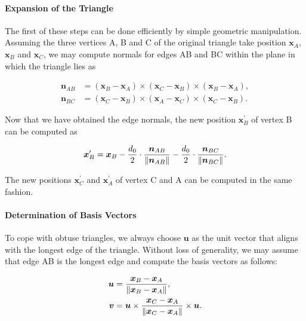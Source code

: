 \documentclass[
	11pt, 
	DIV10,
	ngerman,
	a4paper, 
	oneside, 
	headings=normal, 
	captions=tableheading,
	final, 
	numbers=noenddot
]{scrartcl}
\DeclarePairedDelimiter{\norm}{\lVert}{\rVert}
\begin{document}
\paragraph{Expansion of the Triangle} The first of these steps can be done efficiently by simple geometric manipulation. Assuming the three vertices A, B and C of the original triangle take position $ \boldsymbol{x}_{A} $, $ \boldsymbol{x}_{B} $ and $ \boldsymbol{x}_{C} $, we may compute normals for edges AB and BC within the plane in which the triangle lies as

\begin{equation}
\begin{split}
	\label{eq5}
	\boldsymbol{n}_{AB} &= \left(\boldsymbol{x}_{B} - \boldsymbol{x}_{A}\right) \times \left(\boldsymbol{x}_{C} - \boldsymbol{x}_{B}\right) \times \left(\boldsymbol{x}_{B} - \boldsymbol{x}_{A}\right), \\
	\boldsymbol{n}_{BC} &= \left(\boldsymbol{x}_{C} - \boldsymbol{x}_{B}\right) \times \left(\boldsymbol{x}_{A} - \boldsymbol{x}_{C}\right) \times \left(\boldsymbol{x}_{C} - \boldsymbol{x}_{B}\right).
\end{split}
\end{equation}

Now that we have obtained the edge normals, the new position $ \boldsymbol{x}_{B}^{\prime} $ of vertex B can be computed as

\begin{equation}
	\label{eq6}
	\boldsymbol{x}_{B}^{\prime} = \boldsymbol{x}_{B} - \frac{d_{0}}{2} \cdot \frac{\boldsymbol{n}_{AB}}{\norm{\boldsymbol{n}_{AB}}} - \frac{d_{0}}{2} \cdot \frac{\boldsymbol{n}_{BC}}{\norm{\boldsymbol{n}_{BC}}}.
\end{equation}

The new positions $ \boldsymbol{x}_{C}^{\prime} $ and $ \boldsymbol{x}_{A}^{\prime} $ of vertex C and A can be computed in the same fashion.

\paragraph{Determination of Basis Vectors} To cope with obtuse triangles, we always choose $ \boldsymbol{u} $ as the unit vector that aligns with the longest edge of the triangle. Without loss of generality, we may assume that edge AB is the longest edge and compute the basis vectors as follows:

\begin{equation}
\begin{split}
	\label{eq7}
	\boldsymbol{u} &= \frac{\boldsymbol{x}_{B} - \boldsymbol{x}_{A}}{\norm{\boldsymbol{x}_{B} - \boldsymbol{x}_{A}}}, \\
	\boldsymbol{v} &= \boldsymbol{u} \times \frac{\boldsymbol{x}_{C} - \boldsymbol{x}_{A}}{\norm{\boldsymbol{x}_{C} - \boldsymbol{x}_{A}}} \times \boldsymbol{u}.
\end{split}
\end{equation}
\end{document}
